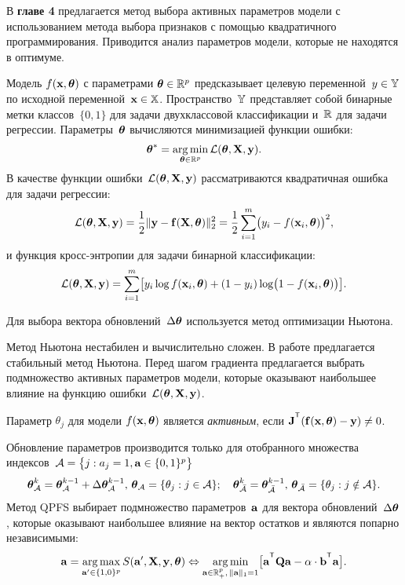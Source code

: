 \documentclass[11pt, a5paper]{dissert}
\begin{document}
В \textbf{главе 4} предлагается метод выбора активных параметров модели с использованием метода выбора признаков с помощью квадратичного программирования. 
Приводится анализ параметров модели, которые не находятся в оптимуме.

Модель $f( \mathbf{x}, \boldsymbol{\theta})$ с параметрами $\boldsymbol{\theta} \in \mathbb{R}^p$ предсказывает целевую переменной~$y \in \mathbb{Y}$ по исходной переменной~$\mathbf{x} \in \mathbb{X}$. Пространство~$\mathbb{Y}$ представляет собой бинарные метки классов~$\{0, 1\}$ для задачи двухклассовой классификации и~$\mathbb{R}$ для задачи регрессии.
Параметры~$\boldsymbol{\theta}$ вычисляются минимизацией функции ошибки:
\begin{equation}
	\boldsymbol{\theta}^* = \mathop{\arg \min}\limits_{\boldsymbol{\theta} \in \mathbb{R}^p} \mathcal{L}(\boldsymbol{\theta}, \mathbf{X}, \mathbf{y}).
	\label{ch4:eq:error_function}
\end{equation}
В качестве функции ошибки~$\mathcal{L} (\boldsymbol{\theta}, \mathbf{X}, \mathbf{y})$ рассматриваются квадратичная ошибка для задачи регрессии:
\begin{equation}
	\mathcal{L}(\boldsymbol{\theta}, \mathbf{X}, \mathbf{y}) = \frac 12 \| \mathbf{y} - \mathbf{f}(\mathbf{X}, \boldsymbol{\theta}) \|_2^2 = \frac 12 \sum_{i=1}^m \bigl( y_i - f(\mathbf{x}_i,  \boldsymbol{\theta})\bigr)^2,
	\label{ch4:eq:squared_error}
\end{equation}
и функция кросс-энтропии для задачи бинарной классификации: 
\begin{equation}
	\mathcal{L}(\boldsymbol{\theta}, \mathbf{X}, \mathbf{y}) = \sum_{i=1}^m \bigl[y_i \log f (\mathbf{x}_i , \boldsymbol{\theta}) + (1-y_i) \log \bigl(1 - f (\mathbf{x}_i , \boldsymbol{\theta})\bigr)\bigr].
	\label{ch4:eq:log_loss}
\end{equation}

Для выбора вектора обновлений~$\Delta \boldsymbol{\theta}$ используется метод оптимизации Ньютона.

Метод Ньютона нестабилен и вычислительно сложен. 
В работе предлагается стабильный метод Ньютона. 
Перед шагом градиента предлагается выбрать подмножество активных параметров модели, которые оказывают наибольшее влияние на функцию ошибки~$\mathcal{L} (\boldsymbol{\theta}, \mathbf{X}, \mathbf{y})$.
\begin{definition}
	\label{ch4:def:active_param}
	Параметр $\theta_j$ для модели $f(\mathbf{x}, \boldsymbol{\theta})$ является \textit{активным}, если $\bJ^{\T} (\mathbf{f}(\bx, \btheta) - \by) \neq 0$.
\end{definition}
Обновление параметров производится только для отобранного множества индексов~$\mathcal{A} = \bigl\{j: a_j = 1, \mathbf{a} \in \{0, 1\}^p\bigr\}$
\begin{equation*}
	\boldsymbol{\theta}_{\mathcal{A}}^k = \boldsymbol{\theta}_{\mathcal{A}}^{k - 1} + \Delta \boldsymbol{\theta}_{\mathcal{A}}^{k - 1}, \, \boldsymbol{\theta}_{\mathcal{A}} = \{\theta_j: j \in \mathcal{A} \}; \quad
	\boldsymbol{\theta}_{\bar{\mathcal{A}}}^k = \boldsymbol{\theta}_{\bar{\mathcal{A}}}^{k - 1}, \, \boldsymbol{\theta}_{\bar{\mathcal{A}}} = \{\theta_j: j \notin \mathcal{A} \}.
\end{equation*}
Метод QPFS выбирает подмножество параметров~$\mathbf{a}$ для вектора обновлений~$ \Delta \boldsymbol{\theta}$, которые оказывают наибольшее влияние на вектор остатков и являются попарно независимыми:
\begin{equation}
	\ba = \argmax_{\ba' \in \{1, 0\}^p} S(\ba', \bX, \by, \btheta) \Leftrightarrow \argmin_{\ba  \in \bbR^p_+, \, \|\ba\|_1=1} \bigl[\ba^{\T} \bQ \ba - \alpha \cdot \mathbf{b}^{\T} \ba \bigr].
\end{equation}
\end{document}
